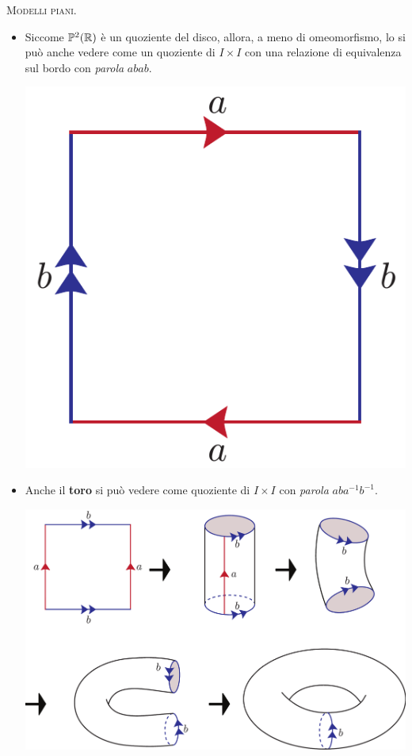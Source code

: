 \begin{examples} \textsc{Modelli piani.}
			\begin{itemize}
		\item Siccome $\mathbb{P}^2(\mathbb{R})$ è un quoziente del disco, allora, a meno di omeomorfismo, lo si può anche vedere come un quoziente di $I\times I$ con una relazione di equivalenza sul bordo con \textit{parola} $abab$.
		\begin{center}
		\includegraphics[trim=0cm 0cm 0cm 0cm, clip, scale=0.375]{images/proj.pdf}
		\end{center}
		\item Anche il \textbf{toro} si può vedere come quoziente di $I\times I$ con \textit{parola} $aba^{-1}b^{-1}$.
		\begin{center}
			\includegraphics[trim=0cm 0cm 0cm 0cm, clip, scale=0.375]{images/torus.pdf}

\end{center}
\end{itemize}
\end{examples}
